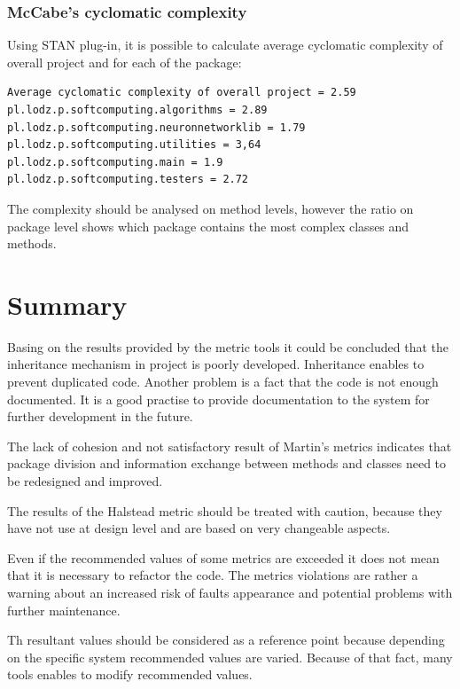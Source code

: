 \subsubsection*{McCabe's cyclomatic complexity}

Using STAN plug-in, it is possible to calculate average cyclomatic complexity of overall project and for each of the package:
\begin{verbatim}
Average cyclomatic complexity of overall project = 2.59
pl.lodz.p.softcomputing.algorithms = 2.89
pl.lodz.p.softcomputing.neuronnetworklib = 1.79 
pl.lodz.p.softcomputing.utilities = 3,64
pl.lodz.p.softcomputing.main = 1.9
pl.lodz.p.softcomputing.testers = 2.72
\end{verbatim}

The complexity should be analysed on method levels, however the ratio on package level shows which package contains the most complex classes and methods.

\section{Summary}

Basing on the results provided by the metric tools it could be concluded that the inheritance mechanism in project is poorly developed. Inheritance enables to prevent duplicated code. Another problem is a fact that the code is not enough documented. It is a good practise to provide documentation to the system for further development in the future. 

The lack of cohesion and not satisfactory result of Martin's metrics indicates that package division and information exchange between methods and classes need to be redesigned and improved. 

The results of the Halstead metric should be treated with caution, because they have not use at design level and are based on very changeable aspects.

Even if the recommended values of some metrics are exceeded it does not mean that it is necessary to refactor the code. The metrics violations are rather a warning about an increased risk of faults appearance and potential problems with further maintenance. 

Th resultant values should be considered as a reference point because depending on the specific system recommended values are varied. Because of that fact, many tools enables to modify  recommended values. 

